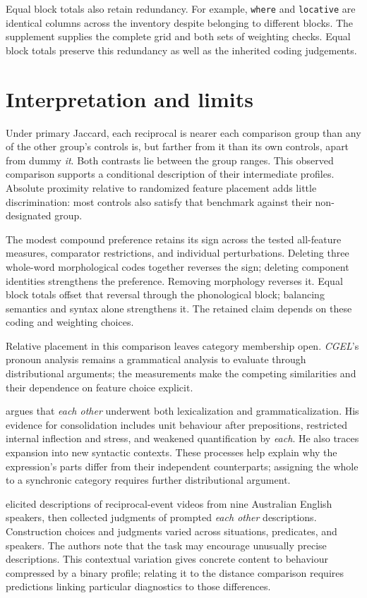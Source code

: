 \documentclass[12pt]{article}
\providecommand{\mention}[1]{\textit{#1}}
\begin{document}
Equal block totals also retain redundancy. For example, \texttt{where} and \texttt{locative} are identical columns across the inventory despite belonging to different blocks. The supplement supplies the complete grid and both sets of weighting checks. Equal block totals preserve this redundancy as well as the inherited coding judgements.

\section{Interpretation and limits}
\label{sec:discussion}

Under primary Jaccard, each reciprocal is nearer each comparison group than any of the other group's controls is, but farther from it than its own controls, apart from dummy \mention{it}. Both contrasts lie between the group ranges. This observed comparison supports a conditional description of their intermediate profiles. Absolute proximity relative to randomized feature placement adds little discrimination: most controls also satisfy that benchmark against their non-designated group.

The modest compound preference retains its sign across the tested all-feature measures, comparator restrictions, and individual perturbations. Deleting three whole-word morphological codes together reverses the sign; deleting component identities strengthens the preference. Removing morphology reverses it. Equal block totals offset that reversal through the phonological block; balancing semantics and syntax alone strengthens it. The retained claim depends on these coding and weighting choices.

Relative placement in this comparison leaves category membership open. \textit{CGEL}'s pronoun analysis remains a grammatical analysis to evaluate through distributional arguments; the measurements make the competing similarities and their dependence on feature choice explicit.

\textcite{haas2007reciprocal} argues that \mention{each other} underwent both lexicalization and grammaticalization. His evidence for consolidation includes unit behaviour after prepositions, restricted internal inflection and stress, and weakened quantification by \mention{each}. He also traces expansion into new syntactic contexts. These processes help explain why the expression's parts differ from their independent counterparts; assigning the whole to a synchronic category requires further distributional argument.

\textcite{hurstNordlinger2011} elicited descriptions of reciprocal-event videos from nine Australian English speakers, then collected judgments of prompted \mention{each other} descriptions. Construction choices and judgments varied across situations, predicates, and speakers. The authors note that the task may encourage unusually precise descriptions. This contextual variation gives concrete content to behaviour compressed by a binary profile; relating it to the distance comparison requires predictions linking particular diagnostics to those differences.
\end{document}
